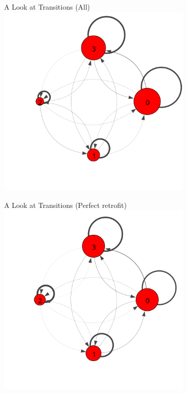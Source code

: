 \documentclass[10pt]{beamer}
\begin{document}
\begin{frame}{A Look at Transitions (All)}
  \centering
  \includegraphics[width=0.70\textwidth]{../figures/trans-comp/trans-avg.png}
\end{frame}

\begin{frame}{A Look at Transitions (Perfect retrofit)}
  \centering
  \includegraphics[width=0.70\textwidth]{../figures/trans-comp/trans-perfect.png}
\end{frame}
\end{document}
